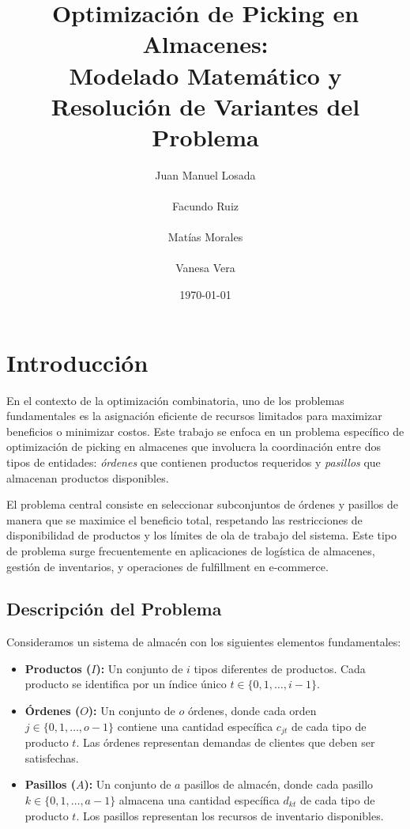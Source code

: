 \documentclass[a4paper,12pt]{article}
\title{Optimización de Picking en Almacenes:\\[1ex]
       \large Modelado Matemático y Resolución de Variantes del Problema}
\author{Juan Manuel Losada \\\\ Facundo Ruiz \\\\ Matías Morales \\\\ Vanesa Vera}
\date{\today}
\begin{document}
\maketitle
\thispagestyle{empty}
\clearpage

\tableofcontents
\clearpage

\section{Introducción}

En el contexto de la optimización combinatoria, uno de los problemas fundamentales es la asignación eficiente de recursos limitados para maximizar beneficios o minimizar costos. Este trabajo se enfoca en un problema específico de optimización de picking en almacenes que involucra la coordinación entre dos tipos de entidades: \emph{órdenes} que contienen productos requeridos y \emph{pasillos} que almacenan productos disponibles.

El problema central consiste en seleccionar subconjuntos de órdenes y pasillos de manera que se maximice el beneficio total, respetando las restricciones de disponibilidad de productos y los límites de ola de trabajo del sistema. Este tipo de problema surge frecuentemente en aplicaciones de logística de almacenes, gestión de inventarios, y operaciones de fulfillment en e-commerce.

\subsection{Descripción del Problema}

Consideramos un sistema de almacén con los siguientes elementos fundamentales:

\begin{itemize}
    \item \textbf{Productos ($I$):} Un conjunto de $i$ tipos diferentes de productos. Cada producto se identifica por un índice único $t \in \{0, 1, \ldots, i-1\}$.
    \item \textbf{Órdenes ($O$):} Un conjunto de $o$ órdenes, donde cada orden $j \in \{0, 1, \ldots, o-1\}$ contiene una cantidad específica $c_{jt}$ de cada tipo de producto $t$. Las órdenes representan demandas de clientes que deben ser satisfechas.
    \item \textbf{Pasillos ($A$):} Un conjunto de $a$ pasillos de almacén, donde cada pasillo $k \in \{0, 1, \ldots, a-1\}$ almacena una cantidad específica $d_{kt}$ de cada tipo de producto $t$. Los pasillos representan los recursos de inventario disponibles.
\end{itemize}
\end{document}
